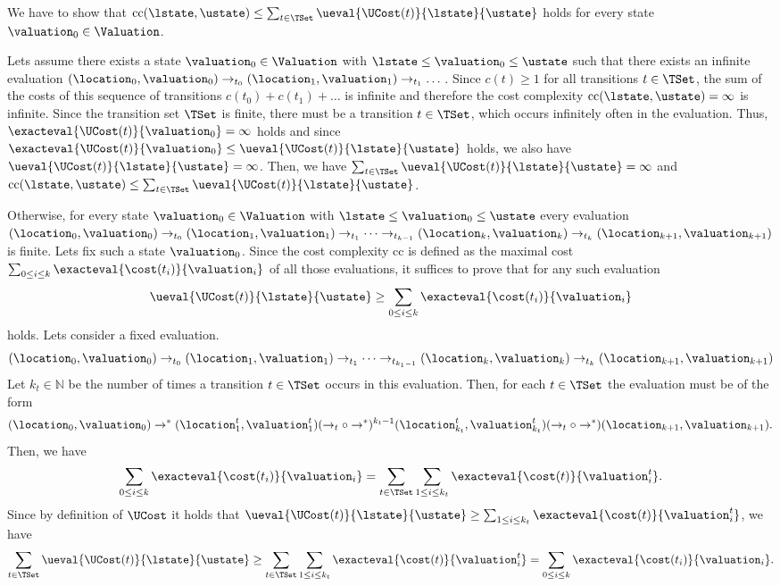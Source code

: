 We have to show that $\text{cc}(\lstate, \ustate) \leq \sum_{t \in \TSet} \ueval{\UCost(t)}{\lstate}{\ustate}$ holds for every state $\valuation_0 \in \Valuation$.

Lets assume there exists a state $\valuation_0 \in \Valuation$ with $\lstate \leq \valuation_0 \leq \ustate$ such that there exists an infinite evaluation $(\location_0, \valuation_0) \rightarrow_{t_0} (\location_1, \valuation_1) \rightarrow_{t_1} \dots$.
Since $c(t) \geq 1$ for all transitions $t \in \TSet$, the sum of the costs of this sequence of transitions $c(t_0) + c(t_1) + \dots$ is infinite and therefore the cost complexity $\text{cc}(\lstate, \ustate) = \infty$ is infinite.
Since the transition set $\TSet$ is finite, there must be a transition $t \in \TSet$, which occurs infinitely often in the evaluation.
Thus, $\exacteval{\UCost(t)}{\valuation_0} = \infty$ holds and since $\exacteval{\UCost(t)}{\valuation_0} \leq \ueval{\UCost(t)}{\lstate}{\ustate}$ holds, we also have $\ueval{\UCost(t)}{\lstate}{\ustate} = \infty$.
Then, we have $\sum_{t \in \TSet} \ueval{\UCost(t)}{\lstate}{\ustate} = \infty$ and $\text{cc}(\lstate, \ustate) \leq \sum_{t \in \TSet} \ueval{\UCost(t)}{\lstate}{\ustate}$.

Otherwise, for every state $\valuation_0 \in \Valuation$ with $\lstate \leq \valuation_0 \leq \ustate$ every evaluation $(\location_0, \valuation_0) \rightarrow_{t_0} (\location_1, \valuation_1) \rightarrow_{t_1} \dots \rightarrow_{t_{k-1}} (\location_k, \valuation_k) \rightarrow_{t_k} (\location_{k+1}, \valuation_{k+1})$ is finite.
Lets fix such a state $\valuation_0$.
Since the cost complexity $\text{cc}$ is defined as the maximal cost $\sum_{0 \leq i \leq k} \exacteval{\cost(t_i)}{\valuation_i}$ of all those evaluations, it suffices to prove that for any such evaluation \[ \ueval{\UCost(t)}{\lstate}{\ustate} \geq \sum_{0 \leq i \leq k} \exacteval{\cost(t_i)}{\valuation_i} \] holds.
Lets consider a fixed evaluation.
\[ (\location_0, \valuation_0) \rightarrow_{t_0} (\location_1, \valuation_1) \rightarrow_{t_1} \dots \rightarrow_{t_{k_1-1}} (\location_k, \valuation_k) \rightarrow_{t_k} (\location_{k+1}, \valuation_{k+1}) \]
Let $k_t \in \mathbb{N}$ be the number of times a transition $t \in \TSet$ occurs in this evaluation.
Then, for each $t \in \TSet$ the evaluation must be of the form
\[ (\location_0, \valuation_0) \rightarrow^* (\location^t_1, \valuation^t_1) (\rightarrow_t \circ \rightarrow^*)^{k_t-1} (\location^t_{k_t}, \valuation^t_{k_t}) (\rightarrow_t \circ \rightarrow^*) (\location_{k+1}, \valuation_{k+1}). \]
Then, we have \[ \sum_{0 \leq i \leq k} \exacteval{\cost(t_i)}{\valuation_i} = \sum_{t \in \TSet} \sum_{1 \leq i \leq k_t} \exacteval{\cost(t)}{\valuation^t_i}. \]
Since by definition of $\UCost$ it holds that $\ueval{\UCost(t)}{\lstate}{\ustate} \geq \sum_{1 \leq i \leq k_t} \exacteval{\cost(t)}{\valuation^t_i}$, we have \[ \sum_{t \in \TSet} \ueval{\UCost(t)}{\lstate}{\ustate} \geq \sum_{t \in \TSet} \sum_{1 \leq i \leq k_t} \exacteval{\cost(t)}{\valuation^t_i} = \sum_{0 \leq i \leq k} \exacteval{\cost(t_i)}{\valuation_i}. \]

